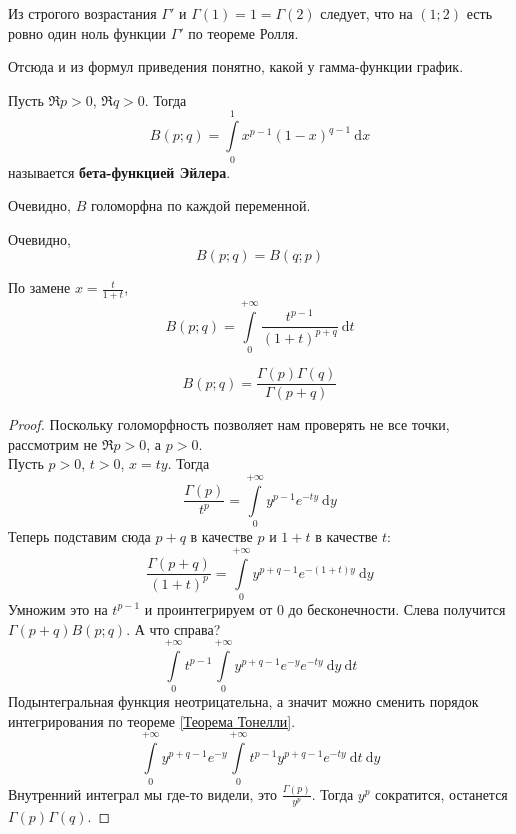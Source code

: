\documentclass{article}
\begin{document}
    \begin{corollary}
        Из строгого возрастания $\Gamma'$ и $\Gamma(1)=1=\Gamma(2)$ следует, что на $(1;2)$ есть ровно один ноль функции $\Gamma'$ по теореме Ролля.
    \end{corollary}
    \begin{remark}
        Отсюда и из формул приведения понятно, какой у гамма-функции график.
    \end{remark}
    \begin{definition}
        Пусть $\Re p>0$, $\Re q>0$. Тогда
        $$
        B(p;q)=\int\limits_0^1x^{p-1}(1-x)^{q-1}~\mathrm dx
        $$
        называется \textbf{бета-функцией Эйлера}.
    \end{definition}
    \begin{property}
        Очевидно, $B$ голоморфна по каждой переменной.
    \end{property}
    \begin{property}
        Очевидно,
        $$B(p;q)=B(q;p)$$
    \end{property}
    \begin{property}
        По замене $x=\frac t{1+t}$,
        $$
        B(p;q)=\int\limits_0^{+\infty}\frac{t^{p-1}}{(1+t)^{p+q}}~\mathrm dt
        $$
    \end{property}
    \begin{property}
        $$
        B(p;q)=\frac{\Gamma(p)\Gamma(q)}{\Gamma(p+q)}
        $$
    \end{property}
    \begin{proof}
        Поскольку голоморфность позволяет нам проверять не все точки, рассмотрим не $\Re p>0$, а $p>0$.\\
        Пусть $p>0$, $t>0$, $x=ty$. Тогда
        $$
        \frac{\Gamma(p)}{t^p}=\int\limits_0^{+\infty}y^{p-1}e^{-ty}~\mathrm dy
        $$
        Теперь подставим сюда $p+q$ в качестве $p$ и $1+t$ в качестве $t$:
        $$
        \frac{\Gamma(p+q)}{(1+t)^p}=\int\limits_0^{+\infty}y^{p+q-1}e^{-(1+t)y}~\mathrm dy
        $$
        Умножим это на $t^{p-1}$ и проинтегрируем от 0 до бесконечности. Слева получится $\Gamma(p+q)B(p;q)$. А что справа?
        $$
        \int\limits_0^{+\infty}t^{p-1}\int\limits_0^{+\infty}y^{p+q-1}e^{-y}e^{-ty}~\mathrm dy~\mathrm dt
        $$
        Подынтегральная функция неотрицательна, а значит можно сменить порядок интегрирования по теореме \ref{Теорема Тонелли}.
        $$
        \int\limits_0^{+\infty}y^{p+q-1}e^{-y}\int\limits_0^{+\infty}t^{p-1}y^{p+q-1}e^{-ty}~\mathrm dt~\mathrm dy
        $$
        Внутренний интеграл мы где-то видели, это $\frac{\Gamma(p)}{y^p}$. Тогда $y^p$ сократится, останется $\Gamma(p)\Gamma(q)$.
    \end{proof}
\end{document}
